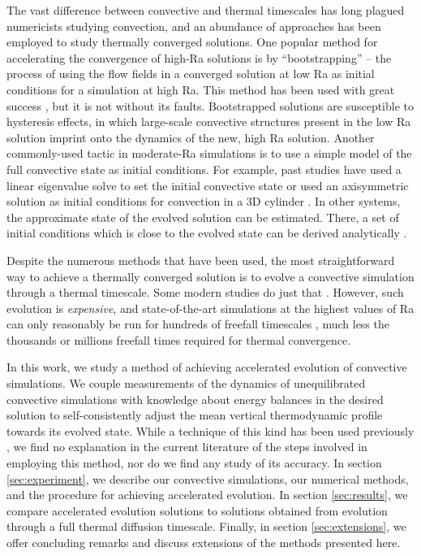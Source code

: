 \documentclass[aps, pre, onecolumn, nofootinbib, notitlepage, groupedaddress, amsfonts, amssymb, amsmath, longbibliography]{revtex4-1}
\begin{document}
The vast difference between convective and thermal timescales has long plagued
numericists studying convection, and an abundance of approaches has been employed to
study thermally converged solutions. One popular method for accelerating the convergence
of high-Ra solutions is by ``bootstrapping'' -- the process of using the flow
fields in a converged solution at low Ra as initial conditions for a simulation at high
Ra.  This method has been used with great success \cite{johnston&doering2009, verzicco&camussi1997},
but it is not without its faults.  Bootstrapped solutions are susceptible to hysteresis
effects, in which large-scale convective structures present in the
low Ra solution imprint onto the dynamics of the new, high Ra solution. 
Another commonly-used tactic in
moderate-Ra simulations is to use 
a simple model of the full convective state as initial conditions.  
For example, past studies have used a linear eigenvalue solve to set the initial
convective state \cite{hurlburt&all1984} or used an axisymmetric solution 
as initial conditions for convection in a 3D cylinder \cite{verzicco&camussi1997}. 
In other systems, 
the approximate state of the evolved solution can be estimated. There, a
set of initial conditions which is close to the evolved state can be 
derived analytically \cite{couston&all2017, brandenburg&all2005}.

Despite the numerous methods that have been used,
the most straightforward way to achieve a thermally converged solution
is to evolve a convective simulation through a thermal timescale. Some modern
studies do just that \cite{featherstone&hindman2016}.
However, such evolution is
\emph{expensive}, and state-of-the-art simulations at the highest values of Ra
can only reasonably be run
for hundreds of freefall timescales \cite{stevens&all2011}, much less the
thousands or millions freefall times required for thermal convergence.

In this work, we study a method of achieving accelerated evolution of
convective simulations. We couple measurements of the dynamics of unequilibrated
convective simulations with knowledge about energy balances in the desired solution
to self-consistently adjust the mean vertical thermodynamic profile towards its evolved state. 
While a technique of this kind has been used previously \cite{hurlburt&all1986}, 
we find no explanation in the current literature of the steps involved in employing
this method, nor do we find any study of its accuracy.
In section \ref{sec:experiment}, we describe our convective simulations, our
numerical methods, and the procedure for achieving accelerated evolution. In
section \ref{sec:results}, we compare accelerated evolution solutions
to solutions obtained from evolution through a full thermal diffusion timescale. Finally,
in section \ref{sec:extensions}, we offer concluding remarks and
discuss extensions of the methods presented here.
\end{document}
